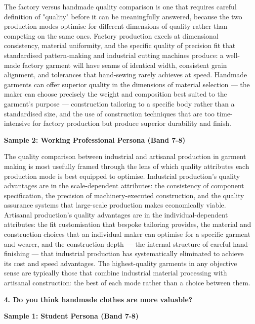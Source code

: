 The factory versus handmade quality comparison is one that requires careful definition of "quality" before it can be meaningfully answered, because the two production modes optimise for different dimensions of quality rather than competing on the same ones. Factory production excels at dimensional consistency, material uniformity, and the specific quality of precision fit that standardised pattern-making and industrial cutting machines produce: a well-made factory garment will have seams of identical width, consistent grain alignment, and tolerances that hand-sewing rarely achieves at speed. Handmade garments can offer superior quality in the dimensions of material selection — the maker can choose precisely the weight and composition best suited to the garment's purpose — construction tailoring to a specific body rather than a standardised size, and the use of construction techniques that are too time-intensive for factory production but produce superior durability and finish.

\textbf{Sample 2: Working Professional Persona (Band 7-8)}

The quality comparison between industrial and artisanal production in garment making is most usefully framed through the lens of which quality attributes each production mode is best equipped to optimise. Industrial production's quality advantages are in the scale-dependent attributes: the consistency of component specification, the precision of machinery-executed construction, and the quality assurance systems that large-scale production makes economically viable. Artisanal production's quality advantages are in the individual-dependent attributes: the fit customisation that bespoke tailoring provides, the material and construction choices that an individual maker can optimise for a specific garment and wearer, and the construction depth — the internal structure of careful hand-finishing — that industrial production has systematically eliminated to achieve its cost and speed advantages. The highest-quality garments in any objective sense are typically those that combine industrial material processing with artisanal construction: the best of each mode rather than a choice between them.

\separator

\begin{ieltsquestion}
\textbf{4. Do you think handmade clothes are more valuable?}
\end{ieltsquestion}
\textbf{Sample 1: Student Persona (Band 7-8)}


